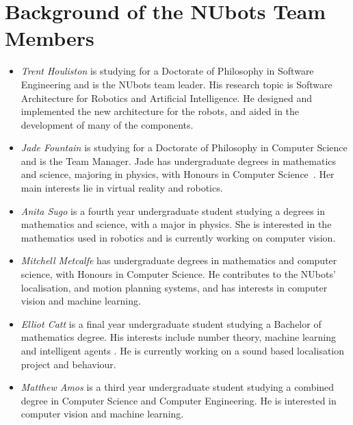 \documentclass{llncs}
\begin{document}

\section{Background of the NUbots Team Members}

\begin{itemize}
\item \emph{Trent Houliston} is studying for a Doctorate of Philosophy in Software Engineering and is the NUbots team leader. His research topic is Software Architecture for Robotics and Artificial Intelligence. He designed and implemented the new architecture for the robots, and aided in the development of many of the components.

\item \emph{Jade Fountain} is studying for a Doctorate of Philosophy in Computer Science and is the Team Manager. Jade has undergraduate degrees in mathematics and science, majoring in physics, with Honours in Computer Science~\cite{FountainChalup2015}. Her main interests lie in virtual reality and robotics.

\item \emph{Anita Sugo} is a fourth year undergraduate student studying a degrees in mathematics and science, with a major in physics. She is interested in the mathematics used in robotics and is currently working on computer vision.

\item \emph{Mitchell Metcalfe} has undergraduate degrees in mathematics and computer science, with Honours in Computer Science. He contributes to the NUbots' localisation, and motion planning systems, and has interests in computer vision and machine learning.

\item \emph{Elliot Catt} is a final year undergraduate student studying a Bachelor of mathematics degree. His interests include number theory,  machine learning and intelligent agents \cite{CattCoonsVelich}. He is currently working on a sound based localisation project and behaviour.

\item \emph{Matthew Amos} is a third year undergraduate student studying a combined degree in Computer Science and Computer Engineering. He is interested in computer vision and machine learning.


\end{itemize}
\end{document}
